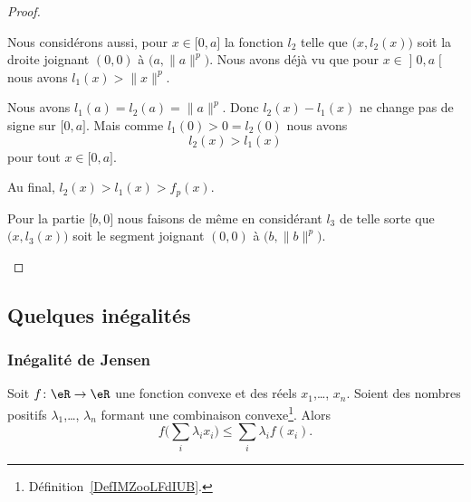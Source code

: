 \begin{proof}
\begin{subproof}
			Nous considérons aussi, pour \( x\in\mathopen[ 0 , a \mathclose]\) la fonction \( l_2\) telle que \( \big( x,l_2(x) \big)\) soit la droite joignant \( (0,0)\) à \( \big( a,\| a \|^p \big)\). Nous avons déjà vu que pour \( x\in \mathopen] 0 , a \mathclose[\) nous avons \( l_1(x)>\| x \|^p\).

		Nous avons \( l_1(a)=l_2(a)=\| a \|^p\). Donc \( l_2(x)-l_1(x)\) ne change pas de signe sur \( \mathopen[ 0 , a \mathclose]\). Mais comme \( l_1(0)>0=l_2(0)\) nous avons
		\begin{equation}
			l_2(x)>l_1(x)
		\end{equation}
		pour tout \( x\in \mathopen[ 0 , a \mathclose]\).

		Au final, \( l_2(x)>l_1(x)>f_p(x)\).

		Pour la partie \( \mathopen[ b , 0 \mathclose]\) nous faisons de même en considérant \( l_3\) de telle sorte que \( \big( x,l_3(x) \big)\) soit le segment joignant \( (0,0)\) à \( \big( b,\| b \|^p \big)\).
	\end{subproof}
\end{proof}

\subsection{Quelques inégalités}

\subsubsection{Inégalité de Jensen}

\begin{proposition}    \label{PropXIBooLxTkhU}
	Soit \( f\colon \eR\to \eR\) une fonction convexe et des réels \( x_1\),\ldots,  \( x_n\). Soient des nombres positifs \( \lambda_1\),\ldots,  \( \lambda_n\) formant une combinaison convexe\footnote{Définition~\ref{DefIMZooLFdIUB}.}. Alors
	\begin{equation}
		f\big( \sum_i\lambda_ix_i \big)\leq \sum_i\lambda_if(x_i).
	\end{equation}
\end{proposition}

